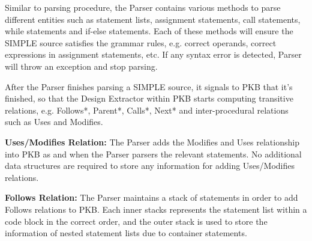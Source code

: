 \documentclass[12pt]{article}
\begin{document}
Similar to parsing procedure, the Parser contains various methods to parse different entities such as statement lists, assignment statements, call statements, while statements and if-else statements. Each of these methods will ensure the SIMPLE source satisfies the grammar rules, e.g. correct operands, correct expressions in assignment statements, etc. If any syntax error is detected, Parser will throw an exception and stop parsing.

After the Parser finishes parsing a SIMPLE source, it signals to PKB that it's finished, so that the Design Extractor within PKB starts computing transitive relations, e.g. Follows*, Parent*, Calls*, Next* and inter-procedural relations such as Uses and Modifies.

\textbf{Uses/Modifies Relation:} The Parser adds the Modifies and Uses relationship into PKB as and when the Parser parsers the relevant statements. No additional data structures are required to store any information for adding Uses/Modifies relations.

\textbf{Follows Relation:} The Parser maintains a stack of statements in order to add Follows relations to PKB. Each inner stacks represents the statement list within a code block in the correct order, and the outer stack is used to store the information of nested statement lists due to container statements.
\end{document}
